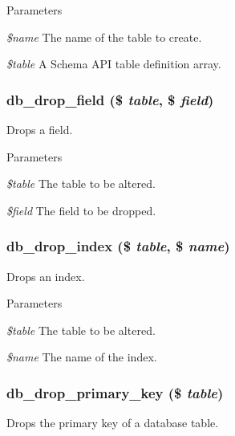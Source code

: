 \begin{DoxyParams}{Parameters}
\item[{\em \$name}]The name of the table to create. \item[{\em \$table}]A Schema API table definition array. \end{DoxyParams}
\hypertarget{group__schemaapi_ga0e404d9200bf56fbed738aa4f57b3ec4}{
\subsubsection[{db\_\-drop\_\-field}]{\setlength{\rightskip}{0pt plus 5cm}db\_\-drop\_\-field (\$ {\em table}, \/  \$ {\em field})}}
\label{group__schemaapi_ga0e404d9200bf56fbed738aa4f57b3ec4}
Drops a field.


\begin{DoxyParams}{Parameters}
\item[{\em \$table}]The table to be altered. \item[{\em \$field}]The field to be dropped. \end{DoxyParams}
\hypertarget{group__schemaapi_gaa59d447eb4a7b25350fb7404f9a70ec0}{
\subsubsection[{db\_\-drop\_\-index}]{\setlength{\rightskip}{0pt plus 5cm}db\_\-drop\_\-index (\$ {\em table}, \/  \$ {\em name})}}
\label{group__schemaapi_gaa59d447eb4a7b25350fb7404f9a70ec0}
Drops an index.


\begin{DoxyParams}{Parameters}
\item[{\em \$table}]The table to be altered. \item[{\em \$name}]The name of the index. \end{DoxyParams}
\hypertarget{group__schemaapi_ga733a41de3d8b74798a8cf3c87ae33715}{
\subsubsection[{db\_\-drop\_\-primary\_\-key}]{\setlength{\rightskip}{0pt plus 5cm}db\_\-drop\_\-primary\_\-key (\$ {\em table})}}
\label{group__schemaapi_ga733a41de3d8b74798a8cf3c87ae33715}
Drops the primary key of a database table.


